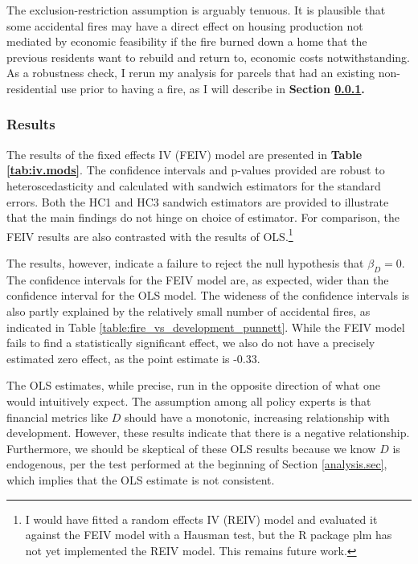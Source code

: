 \documentclass[a4paper,12pt]{article}
\begin{document}
The exclusion-restriction assumption is arguably tenuous. It is plausible that some accidental fires may have a direct effect on housing production not mediated by economic feasibility if the fire burned down a home that the previous residents want to rebuild and return to, economic costs notwithstanding. As a robustness check, I rerun my analysis for parcels that had an existing non-residential use prior to having a fire, as I will describe in \textbf{Section \ref{iv.result}.}

\subsubsection{Results}
\label{iv.result}
The results of the fixed effects IV (FEIV) model are presented in \textbf{Table \ref{tab:iv.mods}}. The confidence intervals and p-values provided are robust to heteroscedasticity and calculated with sandwich estimators for the standard errors. Both the HC1 and HC3 sandwich estimators are provided to illustrate that the main findings do not hinge on choice of estimator. For comparison, the FEIV results are also contrasted with the results of OLS.\footnote{I would have fitted a random effects IV (REIV) model and evaluated it against the FEIV model with a Hausman test, but the R package plm has not yet implemented the REIV model. This remains future work.}

The results, however, indicate a failure to reject the null hypothesis that $\beta_{D} = 0$. The confidence intervals for the FEIV model are, as expected, wider than the confidence interval for the OLS model. The wideness of the confidence intervals is also partly explained by the relatively small number of accidental fires, as indicated in Table \ref{table:fire_vs_development_punnett}. While the FEIV model fails to find a statistically significant effect, we also do not have a precisely estimated zero effect, as the point estimate is -0.33.

The OLS estimates, while precise, run in the opposite direction of what one would intuitively expect. The assumption among all policy experts is that financial metrics like $D$ should have a monotonic, increasing relationship with development. However, these results indicate that there is a negative relationship. Furthermore, we should be skeptical of these OLS results because we know $D$ is endogenous, per the test performed at the beginning of Section \ref{analysis.sec}, which implies that the OLS estimate is not consistent.
\end{document}
